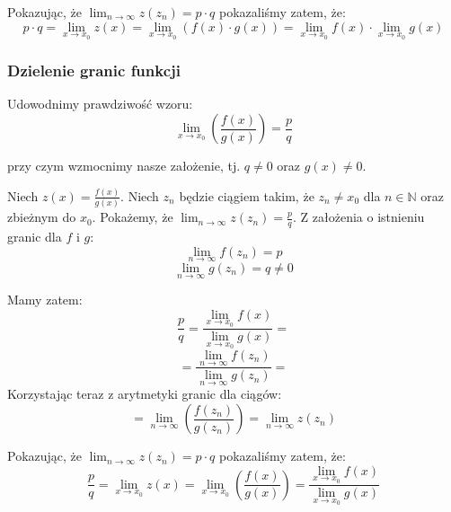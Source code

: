 \documentclass{article}
\begin{document}
Pokazując, że \(\lim_{n \to \infty} z(z_n) = p \cdot q\) pokazaliśmy zatem, że:
\begin{equation*}
    p \cdot q = \lim_{x \to x_0} z(x) = \lim_{x \to x_0} (f(x) \cdot g(x)) = \lim_{x \to x_0} f(x) \cdot \lim_{x \to x_0} g(x)
\end{equation*}

\subsubsection{Dzielenie granic funkcji}

Udowodnimy prawdziwość wzoru: 
\begin{equation*}
    \lim_{x \to x_0}(\frac{f(x)}  {g(x)}) = \frac{p}{q}
\end{equation*}

przy czym wzmocnimy nasze założenie, tj. \(q \neq 0\) oraz \(g(x) \neq 0\).

Niech \(z(x) = \frac{f(x)}{g(x)}\). Niech \(z_n\) będzie ciągiem takim, że \(z_n \neq x_0\) dla \(n \in \mathbb{N}\) oraz zbieżnym do \(x_0\).
Pokażemy, że \(\lim_{n \to \infty} z(z_n) = \frac{p}{q}\). Z założenia o istnieniu granic dla \(f\) i \(g\):
\begin{equation*}
    \lim_{n \to \infty} f(z_n) = p
\end{equation*}
\begin{equation*}
    \lim_{n \to \infty} g(z_n) = q \neq 0
\end{equation*}

Mamy zatem:
\begin{equation*}
    \frac{p}{q} = \frac{\lim_{x \to x_0} f(x)} {\lim_{x \to x_0} g(x)} = 
\end{equation*}
\begin{equation*}
    = \frac{\lim_{n \to \infty} f(z_n)} {\lim_{n \to \infty} g(z_n)} =
\end{equation*}
Korzystając teraz z arytmetyki granic dla ciągów:
\begin{equation*}
    = \lim_{n \to \infty} (\frac{f(z_n)} {g(z_n)}) = \lim_{n \to \infty} z(z_n)
\end{equation*}

Pokazując, że \(\lim_{n \to \infty} z(z_n) = p \cdot q\) pokazaliśmy zatem, że:
\begin{equation*}
    \frac{p}{q} = \lim_{x \to x_0} z(x) = \lim_{x \to x_0} (\frac{f(x)} {g(x)}) = \frac{\lim_{x \to x_0} f(x)} {\lim_{x \to x_0} g(x)}
\end{equation*}
\end{document}
